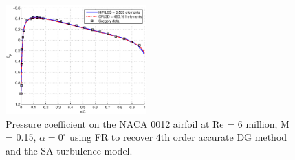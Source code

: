 \begin{figure}
\centering
  \includegraphics[width=0.48\textwidth]{cp.eps}
  \caption{Pressure coefficient on the NACA 0012 airfoil at Re = 6 million, M = 0.15, $\alpha = 0^{\circ}$ using FR to recover 4th order accurate DG method and the SA turbulence model.}
  \label{RANS_naca0012_cp}
\end{figure}

